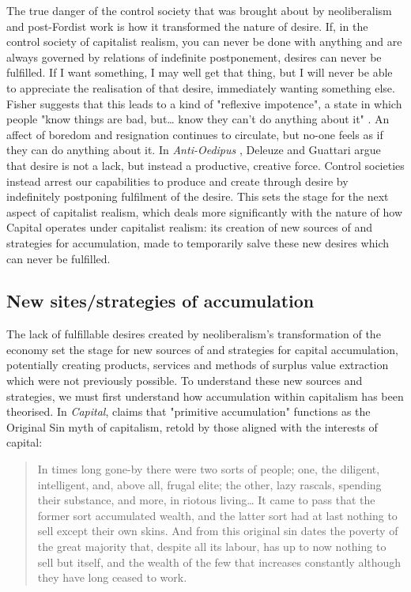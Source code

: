 The true danger of the control society that was brought about by neoliberalism and post-Fordist work is how it transformed the nature of desire. If, in the control society of capitalist realism, you can never be done with anything and are always governed by relations of indefinite postponement, desires can never be fulfilled. If I want something, I may well get that thing, but I will never be able to appreciate the realisation of that desire, immediately wanting something else. Fisher suggests that this leads to a kind of "reflexive impotence", a state in which people "know things are bad, but\ldots{} know they can't do anything about it" \citep[21]{fisher_capitalist_2009}. An affect of boredom and resignation continues to circulate, but no-one feels as if they can do anything about it. In \emph{Anti-Oedipus} \citet{deleuze_anti-oedipus:_1983}, Deleuze and Guattari argue that desire is not a lack, but instead a productive, creative force. Control societies instead arrest our capabilities to produce and create through desire by indefinitely postponing fulfilment of the desire.  This sets the stage for the next aspect of capitalist realism, which deals more significantly with the nature of how Capital operates under capitalist realism: its creation of new sources of and strategies for accumulation, made to temporarily salve these new desires which can never be fulfilled.


\subsection{New sites/strategies of accumulation }
\label{subsec:new-sites-strategies-of-accumulation}

The lack of fulfillable desires created by neoliberalism's transformation of the economy set the stage for  new sources of and strategies for capital accumulation, potentially creating products, services and methods of surplus value extraction which were not previously possible. To understand these new sources and strategies, we must first understand how accumulation within capitalism has been theorised. In \emph{Capital},  \citet[736]{marx_capital_1889} claims that "primitive accumulation" functions as the Original Sin myth of capitalism, retold by those aligned with the interests of capital:

\begin{quote}
In times long gone-by there were two sorts of people; one, the diligent, intelligent, and, above all, frugal elite; the other, lazy rascals, spending their substance, and more, in riotous living\ldots{} It came to pass that the former sort accumulated wealth, and the latter sort had at last nothing to sell except their own skins. And from this original sin dates the poverty of the great majority that, despite all its labour, has up to now nothing to sell but itself, and the wealth of the few that increases constantly although they have long ceased to work.
\end{quote}

